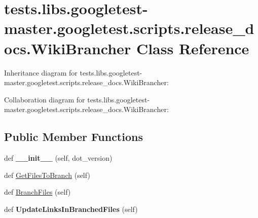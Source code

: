 \hypertarget{classtests_1_1libs_1_1googletest-master_1_1googletest_1_1scripts_1_1release__docs_1_1WikiBrancher}{}\section{tests.\+libs.\+googletest-\/master.googletest.\+scripts.\+release\+\_\+docs.\+Wiki\+Brancher Class Reference}
\label{classtests_1_1libs_1_1googletest-master_1_1googletest_1_1scripts_1_1release__docs_1_1WikiBrancher}


Inheritance diagram for tests.\+libs.\+googletest-\/master.googletest.\+scripts.\+release\+\_\+docs.\+Wiki\+Brancher\+:


Collaboration diagram for tests.\+libs.\+googletest-\/master.googletest.\+scripts.\+release\+\_\+docs.\+Wiki\+Brancher\+:
\subsection*{Public Member Functions}
\begin{DoxyCompactItemize}
\item 
\mbox{\label{classtests_1_1libs_1_1googletest-master_1_1googletest_1_1scripts_1_1release__docs_1_1WikiBrancher_a63618df306536e062cff0f2e5eae2367}} 
def {\bfseries \+\_\+\+\_\+init\+\_\+\+\_\+} (self, dot\+\_\+version)
\item 
def \hyperlink{classtests_1_1libs_1_1googletest-master_1_1googletest_1_1scripts_1_1release__docs_1_1WikiBrancher_a92c07ce6f91ce967af1f0f48ea32d569}{Get\+Files\+To\+Branch} (self)
\item 
def \hyperlink{classtests_1_1libs_1_1googletest-master_1_1googletest_1_1scripts_1_1release__docs_1_1WikiBrancher_a9e12b8bec0fc3a6dfb602df3def660b9}{Branch\+Files} (self)
\item 
\mbox{\label{classtests_1_1libs_1_1googletest-master_1_1googletest_1_1scripts_1_1release__docs_1_1WikiBrancher_ad3af84a29158cea993c61e9f556059da}} 
def {\bfseries Update\+Links\+In\+Branched\+Files} (self)
\end{DoxyCompactItemize}
